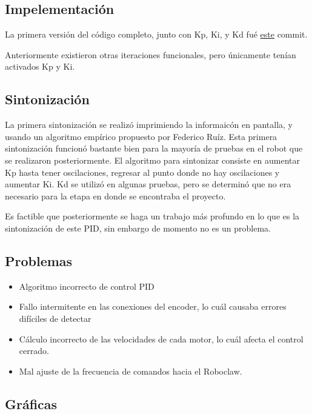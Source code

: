 \subsection{Impelementación}

La primera versión del código completo, junto con Kp, Ki, y Kd fué \href{https://github.com/arcoslab/stm32-roboclaw/commit/c8343d63d9700cd875b26012ce02b7371ca90b14#diff-33370e836e50db43bdb5933ccd61ab9e}{este} commit.


Anteriormente existieron otras iteraciones funcionales, pero únicamente tenían activados Kp y Ki.

\subsection{Sintonización}

La primera sintonización se realizó imprimiendo la informaicón en pantalla, y usando un algoritmo empírico propuesto por Federico Ruíz. Esta primera sintonización funcionó bastante bien para la mayoría de pruebas en el robot que se realizaron posteriormente. El algoritmo para sintonizar consiste en aumentar Kp hasta tener oscilaciones, regresar al punto donde no hay oscilaciones y aumentar Ki. Kd se utilizó en algunas pruebas, pero se determinó que no era necesario para la etapa en donde se encontraba el proyecto.

Es factible que posteriormente se haga un trabajo más profundo en lo que es la sintonización de este PID, sin embargo de momento no es un problema.

\subsection{Problemas}

\begin{itemize}
\item Algoritmo incorrecto de control PID
\item Fallo intermitente en las conexiones del encoder, lo cuál causaba errores difíciles de detectar
\item Cálculo incorrecto de las velocidades de cada motor, lo cuál afecta el control cerrado.
\item Mal ajuste de la frecuencia de comandos hacia el Roboclaw.
\end{itemize}

\subsection{Gráficas}

